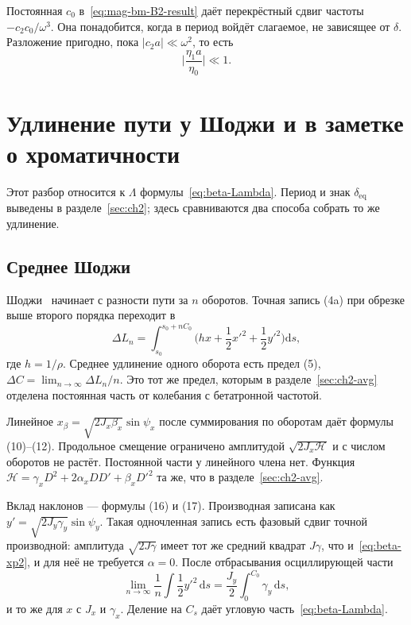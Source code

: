\documentclass[aps,pra,preprint,a4paper,amsmath,amssymb,longbibliography]{revtex4-2}
\begin{document}
Постоянная $c_0$ в~\eqref{eq:mag-bm-B2-result} даёт перекрёстный сдвиг частоты $-c_2 c_0/\omega^3$. Она понадобится, когда в период войдёт слагаемое, не зависящее от $\delta$. Разложение пригодно, пока $|c_2 a|\ll\omega^2$, то есть
\begin{equation}
\label{eq:mag-bm-valid}
\biggl|\frac{\eta_1 a}{\eta_0}\biggr|\ll 1.
\end{equation}
\section{Удлинение пути у Шоджи и в заметке о хроматичности}
\label{app:ch2path}

Этот разбор относится к $\Lambda$ формулы~\eqref{eq:beta-Lambda}. Период и знак $\delta_{\mathrm{eq}}$ выведены в разделе~\ref{sec:ch2}; здесь сравниваются два способа собрать то же удлинение.

\subsection{Среднее Шоджи}
\label{sec:ch2-shoji}

Шоджи~\cite{Shoji2005} начинает с разности пути за $n$ оборотов. Точная запись (4a) при обрезке выше второго порядка переходит в
\begin{equation}
\label{eq:beta-shoji-4b}
\Delta L_n
=\int_{s_0}^{s_0+n C_0}
\Biggl(hx+\frac{1}{2}x'^2+\frac{1}{2}y'^2\Biggr)\mathrm{d}s,
\end{equation}
где $h=1/\rho$. Среднее удлинение одного оборота есть предел (5), $\Delta C=\lim_{n\to\infty}\Delta L_n/n$. Это тот же предел, которым в разделе~\ref{sec:ch2-avg} отделена постоянная часть от колебания с бетатронной частотой.

Линейное $x_\beta=\sqrt{2J_x\beta_x}\sin\psi_x$ после суммирования по оборотам даёт формулы (10)--(12). Продольное смещение ограничено амплитудой $\sqrt{2J_x\mathcal{H}}$ и с числом оборотов не растёт. Постоянной части у линейного члена нет. Функция $\mathcal{H}=\gamma_x D^2+2\alpha_x DD'+\beta_x D'^2$ та же, что в разделе~\ref{sec:ch2-avg}.

Вклад наклонов --- формулы (16) и (17). Производная записана как $y'=\sqrt{2J_y\gamma_y}\sin\psi_y$. Такая одночленная запись есть фазовый сдвиг точной производной: амплитуда $\sqrt{2J\gamma}$ имеет тот же средний квадрат $J\gamma$, что и~\eqref{eq:beta-xp2}, и для неё не требуется $\alpha=0$. После отбрасывания осциллирующей части
\begin{equation}
\label{eq:beta-shoji-slope}
\lim_{n\to\infty}\frac{1}{n}\int\frac{1}{2}y'^2\,\mathrm{d}s
=\frac{J_y}{2}\int_0^{C_0}\gamma_y\,\mathrm{d}s,
\end{equation}
и то же для $x$ с $J_x$ и $\gamma_x$. Деление на $C_s$ даёт угловую часть~\eqref{eq:beta-Lambda}.
\end{document}
